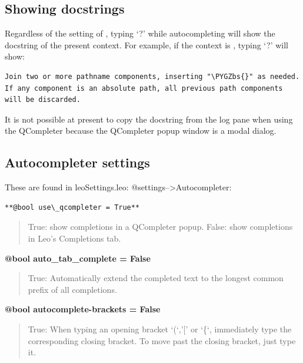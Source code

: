 \documentclass[a4paper,10pt,english]{sphinxmanual}
\def\PYGZbs{\char`\\}
\begin{document}
\subsection{Showing docstrings}
\label{commands:showing-docstrings}
Regardless of the setting of , typing `?' while
autocompleting will show the docstring of the present context. For example,
if the context is , typing `?' will show:

\begin{Verbatim}[commandchars=\\\{\}]
Join two or more pathname components, inserting "\PYGZbs{}" as needed.
If any component is an absolute path, all previous path components
will be discarded.
\end{Verbatim}

It is not possible at present to copy the docstring from the log pane when
using the QCompleter because the QCompleter popup window is a modal dialog.


\subsection{Autocompleter settings}
\label{commands:autocompleter-settings}
These are found in leoSettings.leo: @settings--\textgreater{}Autocompleter:

\begin{Verbatim}[commandchars=\\\{\}]
**@bool use\_qcompleter = True**
\end{Verbatim}
\begin{quote}

True:  show completions in a QCompleter popup.
False: show completions in Leo's Completions tab.
\end{quote}

\textbf{@bool auto\_tab\_complete = False}
\begin{quote}

True: Automatically extend the completed text to the longest common
prefix of all completions.
\end{quote}

\textbf{@bool autocomplete-brackets = False}
\begin{quote}

True: When typing an opening bracket `(`,'{[}' or `\{`, immediately type
the corresponding closing bracket. To move past the closing bracket,
just type it.
\end{quote}
\end{document}
